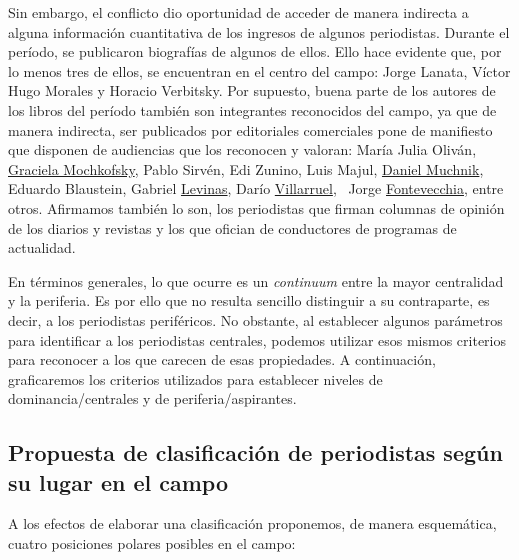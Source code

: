 Sin embargo, el conflicto dio oportunidad de acceder de manera indirecta a alguna información cuantitativa de los ingresos de algunos periodistas. Durante el período, se publicaron biografías de algunos de ellos. Ello hace evidente que, por lo menos tres de ellos, se encuentran en el centro del campo: Jorge Lanata, Víctor Hugo Morales y Horacio Verbitsky. Por supuesto, buena parte de los autores de los libros del período también son integrantes reconocidos del campo, ya que de manera indirecta, ser publicados por editoriales comerciales pone de manifiesto que disponen de audiencias que los reconocen y valoran: María Julia Oliván, \href{http://www.tematika.com/buscar.do?seccionDeBusqueda=En+Libros\&seccion=1\&claveDeBusqueda=porAutor\&txtencoded=Graciela+Mochkofsky\&idAutor=35432\&criterioDeOrden=2\&idSeccion=1\&texto=Graciela+Mochkofsky\&optSeleccionada=Autor\&idSeccionPropia=1}{Graciela Mochkofsky}, Pablo Sirvén, Edi Zunino, Luis Majul, \href{http://www.edhasa.com.ar/busqueda-avanzada.php?autor=Daniel+Muchnik\&avanzada=1}{Daniel Muchnik}, Eduardo Blaustein, Gabriel \href{http://www.edicionesb-argentina.com/autor/levinas-daniel/}{Levinas}, Darío \href{http://www.cuspide.com/resultados.aspx?c=VILLARRUEL+DARIO\&por=AutorEstricto\&aut=291343\&orden=fecha}{Villarruel}, ~Jorge \href{http://www.cuspide.com/resultados.aspx?c=FONTEVECCHIA+JORGE\&por=AutorEstricto\&aut=264707\&orden=fecha}{Fontevecchia}, entre otros. Afirmamos también lo son, los periodistas que firman columnas de opinión de los diarios y revistas y los que ofician de conductores de programas de actualidad.

En términos generales, lo que ocurre es un \emph{continuum} entre la mayor centralidad y la periferia. Es por ello que no resulta sencillo distinguir a su contraparte, es decir, a los periodistas periféricos. No obstante, al establecer algunos parámetros para identificar a los periodistas centrales, podemos utilizar esos mismos criterios para reconocer a los que carecen de esas propiedades. A continuación, graficaremos los criterios utilizados para establecer niveles de dominancia/centrales y de periferia/aspirantes.

\subsection{Propuesta de clasificación de periodistas según su lugar en el campo}

A los efectos de elaborar una clasificación proponemos, de manera esquemática, cuatro posiciones polares posibles en el campo:


